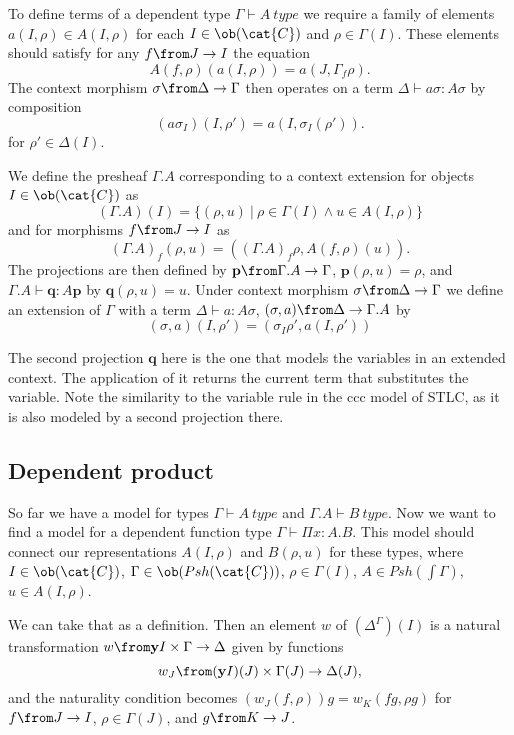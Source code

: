 To define terms of a dependent type $\Gamma \vdash A~type$ we require a family
of elements $a(I, \rho) \in A(I, \rho)$ for each $I \in \ob(\cat{C})$ and $\rho
\in \Gamma(I)$. These elements should satisfy for any $f \from J \to I$ the
equation
\[
  A(f, \rho)(a(I, \rho)) = a(J, \Gamma_f \rho).
\]
The context morphism $\sigma \from \Delta \to \Gamma$ then operates on a term
$\Delta \vdash a\sigma : A\sigma$ by composition
\[
  (a\sigma_I)(I, \rho') = a(I, \sigma_I(\rho')).
\]
for $\rho' \in \Delta(I)$.

We define the presheaf $\Gamma.A$ corresponding to a context extension for
objects $I \in \ob(\cat{C})$ as
\[
  (\Gamma.A)(I) = \{(\rho, u)~|~\rho \in \Gamma(I) \land u \in A(I, \rho)\}
\]
and for morphisms $f \from J \to I$ as
\[
  (\Gamma.A)_f(\rho, u) = ((\Gamma.A)_f \rho, A(f, \rho)(u)).
\]
The projections are then defined by $\mathbf{p} \from \Gamma.A \to \Gamma$,
$\mathbf{p}(\rho, u) = \rho$, and $\Gamma.A \vdash \mathbf{q} : A\mathbf{p}$ by
$\mathbf{q}(\rho, u) = u$. Under context morphism $\sigma \from \Delta \to
\Gamma$ we define an extension of $\Gamma$ with a term $\Delta \vdash a :
A\sigma$, $(\sigma, a) \from \Delta \to \Gamma.A$ by
\[
  (\sigma, a)(I, \rho') = (\sigma_I \rho', a(I, \rho'))
\]

The second projection $\mathbf{q}$ here is the one that models the variables in
an extended context. The application of it returns the current term that
substitutes the variable. Note the similarity to the variable rule in the ccc
model of STLC, as it is also modeled by a second projection there.

\subsection*{Dependent product}

So far we have a model for types $\Gamma \vdash A~type$ and $\Gamma.A \vdash
B~type$. Now we want to find a model for a dependent function type $\Gamma
\vdash \Pi x:A.B$. This model should connect our representations $A(I, \rho)$
and $B(\rho, u)$ for these types, where $I \in \ob(\cat{C})$, $\Gamma \in
\ob(Psh(\cat{C}))$, $\rho \in \Gamma(I)$, $A \in Psh(\int \Gamma)$, $u \in A(I,
\rho)$.

We can take that as a definition. Then an element $w$ of $(\Delta^\Gamma)(I)$
is a natural transformation $w \from \mathbf{y}I\times \Gamma \to \Delta$ given
by functions
\[
  w_J \from (\mathbf{y}I)(J) \times \Gamma(J) \to \Delta(J),
\]
and the naturality condition becomes $(w_J(f, \rho))g = w_K(fg, \rho g)$ for $f
\from J \to I$, $\rho \in \Gamma(J)$, and $g \from K \to J$.

